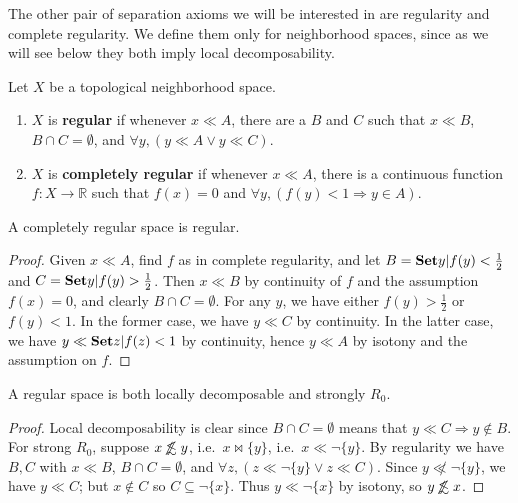 \documentclass{article}
\def\R{\mathbb{R}}
\def\oapt{\mathrel{\!\not\,\not\lesssim}}
\def\cpl#1{\neg #1}
\let\implies\Rightarrow
\def\singleton#1{\{#1\}}
\begin{document}
The other pair of separation axioms we will be interested in are regularity and complete regularity.
We define them only for neighborhood spaces, since as we will see below they both imply local decomposability.

\begin{defn}
  Let $X$ be a topological neighborhood space.
  \begin{enumerate}
  \item $X$ is \textbf{regular} if whenever $x\ll A$, there are a $B$ and $C$ such that $x\ll B$, $B\cap C = \emptyset$, and $\forall y, (y\ll A \lor y\ll C)$.
  \item $X$ is \textbf{completely regular} if whenever $x\ll A$, there is a continuous function $f:X\to \R$ such that $f(x)=0$ and $\forall y, (f(y)<1 \implies y\in A)$.
  \end{enumerate}
\end{defn}

\begin{lem}\label{thm:creg-reg}
  A completely regular space is regular.
\end{lem}
\begin{proof}
  Given $x\ll A$, find $f$ as in complete regularity, and let $B = \setof{y|f(y)<\frac12}$ and $C = \setof{y|f(y)>\frac12}$.
  Then $x\ll B$ by continuity of $f$ and the assumption $f(x)=0$, and clearly $B\cap C = \emptyset$.
  For any $y$, we have either $f(y)>\frac12$ or $f(y)<1$.
  In the former case, we have $y \ll C$ by continuity.
  In the latter case, we have $y \ll \setof{z|f(z)<1}$ by continuity, hence $y\ll A$ by isotony and the assumption on $f$.
\end{proof}

\begin{thm}
  A regular space is both locally decomposable and strongly $R_0$.
\end{thm}
\begin{proof}
  Local decomposability is clear since $B\cap C=\emptyset$ means that $y\ll C \implies y\notin B$.
  For strong $R_0$, suppose $x\oapt y$, i.e.\ $x\bowtie \singleton{y}$, i.e.\ $x\ll \cpl{\singleton{y}}$.
  By regularity we have $B,C$ with $x\ll B$, $B\cap C = \emptyset$, and $\forall z, (z\ll \cpl{\singleton{y}} \lor z\ll C)$.
  Since $y\not\ll \cpl{\singleton{y}}$, we have $y\ll C$; but $x\notin C$ so $C\subseteq \cpl{\singleton{x}}$.
  Thus $y\ll\cpl{\singleton{x}}$ by isotony, so $y\oapt x$.
\end{proof}
\end{document}
